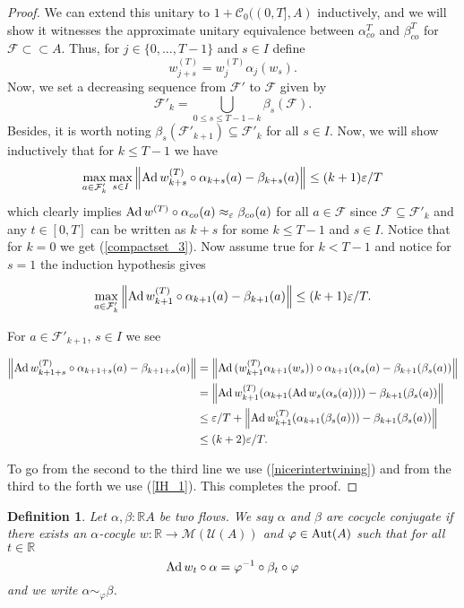 \documentclass[11pt,a4paper,oneside]{amsart}
\newtheorem{definition}[theorem]{Definition}
\def\Rz{\mathbb{R}}
\newcommand{\Aut}{{\rm Aut}}
\newcommand{\Ad}{{\rm Ad\,}}
\newcommand{\norm}[1]{\left\|#1\right\|} %
\begin{document}
\begin{proof}
We can extend this unitary to $1+ \mathcal C_0((0,T], A)$ inductively, and we will show it witnesses the approximate unitary equivalence between $\alpha_{co}^T$ and $\beta_{co}^T$ for $\mathcal F \subset \subset A$. Thus, for $j\in \{0,..., T-1\}$ and $s\in I$ define \[w^{(T)}_{j+s}=w^{(T)}_j\alpha_j(w_s).\] Now, we set a decreasing sequence from $\mathcal F'$ to $\mathcal F$ given by \[\mathcal F'_k=\bigcup_{0\leq s\leq T-1-k}\beta_s(\mathcal F).\] Besides, it is worth noting $\beta_s(\mathcal F'_{k+1})\subseteq \mathcal F'_{k}$ for all $s\in I$. Now, we will show inductively that for $k\leq T-1$ we have \begin{align}
\max_{a\in \mathcal F'_k} \max_{s\in I}\norm {\Ad w_{k+s}^{(T)}\circ \alpha_{k+s}(a)-\beta_{k+s}(a)}\leq {(k+1)}\varepsilon/T
\end{align}
which clearly implies $\Ad w^{(T)}\circ \alpha_{co}(a)\approx_\varepsilon \beta_{co}(a)$ for all $a\in \mathcal F$ since $ \mathcal F\subseteq \mathcal F'_k$ and any $t\in [0,T]$ can be written as $k+s$ for some $k\leq T-1$ and $s\in I$. Notice that for $k=0$ we get (\ref{compactset_3}). Now assume true for $k<T-1$ and notice for $s=1$ the induction hypothesis gives 

\begin{align}
\label{IH_1}
\max_{a\in \mathcal F'_k} \norm {\Ad w_{k+1}^{(T)}\circ \alpha_{k+1}(a)-\beta_{k+1}(a)}\leq {(k+1)}\varepsilon/T.
\end{align}

For $a\in \mathcal F'_{k+1}$, $s\in I$ we see 

\begin{align}
 \norm {\Ad w_{k+1+s}^{(T)}\circ \alpha_{k+1+s}(a)-\beta_{k+1+s}(a)}&= \norm{\Ad (w^{(T)}_{k+1}\alpha_{k+1}(w_s))\circ \alpha_{k+1}(\alpha_s(a)-\beta_{k+1}(\beta_s(a))}\\& = \norm{\Ad w_{k+1}^{(T)}(\alpha_{k+1}(\Ad w_s(\alpha_s(a))))- \beta_{k+1}(\beta_s(a))}\\& \leq \varepsilon/T + \norm{\Ad w^{(T)}_{k+1}(\alpha_{k+1}(\beta_s(a)))-\beta_{k+1}(\beta_s(a))}\\ & \leq (k+2)\varepsilon/T.
\end{align}

To go from the second to the third line we use (\ref{nicerintertwining}) and from the third to the forth we use (\ref{IH_1}). This completes the proof. 
\end{proof}

\begin{definition}
Let $\alpha,\beta:\Rz A$ be two flows. We say $\alpha$ and $\beta$ are cocycle conjugate if there exists an $\alpha$-cocyle $w: \Rz\rightarrow \mathcal M(\mathcal U (A))$ and $\varphi\in \Aut(A)$ such that for all $t\in \Rz$ \[\Ad w_t\circ \alpha=\varphi^{-1}\circ \beta_t\circ \varphi\] and we  write $\alpha \sim_\varphi \beta$. 
\end{definition}
\end{document}

